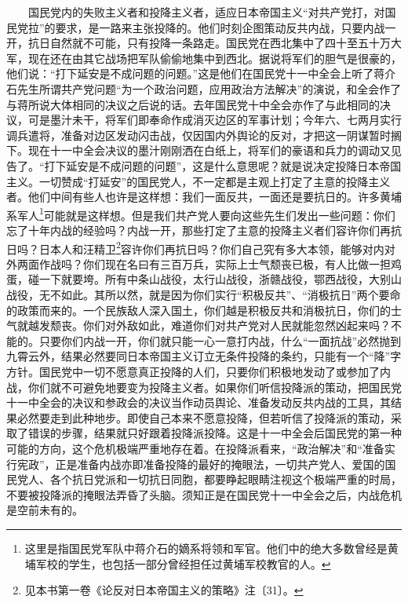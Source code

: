 \documentclass[cn,11pt,chinese]{elegantbook}
\begin{document}
　　国民党内的失败主义者和投降主义者，适应日本帝国主义“对共产党打，对国民党拉”的要求，是一路来主张投降的。他们时刻企图策动反共内战，只要内战一开，抗日自然就不可能，只有投降一条路走。国民党在西北集中了四十至五十万大军，现在还在由其它战场把军队偷偷地集中到西北。据说将军们的胆气是很豪的，他们说：“打下延安是不成问题的问题。”这是他们在国民党十一中全会上听了蒋介石先生所谓共产党问题“为一个政治问题，应用政治方法解决”的演说，和全会作了与蒋所说大体相同的决议之后说的话。去年国民党十中全会亦作了与此相同的决议，可是墨汁未干，将军们即奉命作成消灭边区的军事计划；今年六、七两月实行调兵遣将，准备对边区发动闪击战，仅因国内外舆论的反对，才把这一阴谋暂时搁下。现在十一中全会决议的墨汁刚刚洒在白纸上，将军们的豪语和兵力的调动又见告了。“打下延安是不成问题的问题”，这是什么意思呢？就是说决定投降日本帝国主义。一切赞成“打延安”的国民党人，不一定都是主观上打定了主意的投降主义者。他们中间有些人也许是这样想：我们一面反共，一面还是要抗日的。许多黄埔系军人\footnote[2]{ 这里是指国民党军队中蒋介石的嫡系将领和军官。他们中的绝大多数曾经是黄埔军校的学生，也包括一部分曾经担任过黄埔军校教官的人。}可能就是这样想。但是我们共产党人要向这些先生们发出一些问题：你们忘了十年内战的经验吗？内战一开，那些打定了主意的投降主义者们容许你们再抗日吗？日本人和汪精卫\footnote[3]{ 见本书第一卷《论反对日本帝国主义的策略》注〔31〕。}容许你们再抗日吗？你们自己究有多大本领，能够对内对外两面作战吗？你们现在名曰有三百万兵，实际上士气颓丧已极，有人比做一担鸡蛋，碰一下就要垮。所有中条山战役，太行山战役，浙赣战役，鄂西战役，大别山战役，无不如此。其所以然，就是因为你们实行“积极反共”、“消极抗日”两个要命的政策而来的。一个民族敌人深入国土，你们越是积极反共和消极抗日，你们的士气就越发颓丧。你们对外敌如此，难道你们对共产党对人民就能忽然凶起来吗？不能的。只要你们内战一开，你们就只能一心一意打内战，什么“一面抗战”必然抛到九霄云外，结果必然要同日本帝国主义订立无条件投降的条约，只能有一个“降”字方针。国民党中一切不愿意真正投降的人们，只要你们积极地发动了或参加了内战，你们就不可避免地要变为投降主义者。如果你们听信投降派的策动，把国民党十一中全会的决议和参政会的决议当作动员舆论、准备发动反共内战的工具，其结果必然要走到此种地步。即使自己本来不愿意投降，但若听信了投降派的策动，采取了错误的步骤，结果就只好跟着投降派投降。这是十一中全会后国民党的第一种可能的方向，这个危机极端严重地存在着。在投降派看来，“政治解决”和“准备实行宪政”，正是准备内战亦即准备投降的最好的掩眼法，一切共产党人、爱国的国民党人、各个抗日党派和一切抗日同胞，都要睁起眼睛注视这个极端严重的时局，不要被投降派的掩眼法弄昏了头脑。须知正是在国民党十一中全会之后，内战危机是空前未有的。\\
\end{document}
